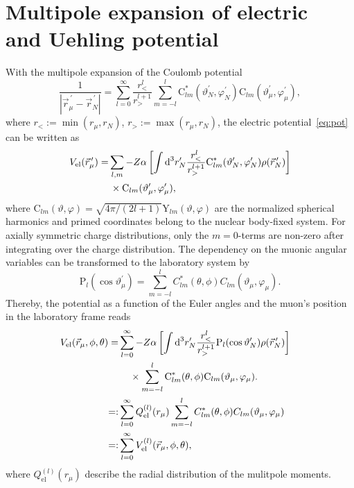 \section{Multipole expansion of electric \\and Uehling potential}
\label{sec:multipole}
With the multipole expansion of the Coulomb potential~\cite{jackson1999}
\begin{equation}
\frac{1}{|\vec{r}_\mu^{\,\prime}-\vec{r}_N^{\,\prime}|}=\sum_{l=0}^\infty \frac{r_<^l}{r_>^{l+1}}\sum_{m=-l}^l  \text{C}^*_{lm}(\vartheta_N^{\prime},\varphi_N^{\prime})\text{C}_{lm}(\vartheta_\mu^\prime,\varphi_\mu^\prime),
\end{equation}
where $r_<:=\min (r_\mu,r_N)$, $r_>:=\max (r_\mu,r_N)$, the electric potential~\eqref{eq:pot} can be written as
\begin{align}
V_{\text{el}}(\vec{r}_\mu^{\,\prime})=&\sum_{l,m}-Z\alpha \left[ \int \text{d}^3r^{\prime}_N \frac{r_<^l}{r_>^{l+1}}\text{C}^*_{lm}(\vartheta_N^{\prime},\varphi_N^{\prime})\rho(\vec{r}_N^{\,\prime})\right]\notag\\
&\,\times\text{C}_{lm}(\vartheta_\mu^{\prime},\varphi_\mu^\prime),
\end{align}
where ${\text{C}_{lm}(\vartheta,\varphi)}{=}{\sqrt{4\pi/(2l+1)}\text{Y}_{lm}(\vartheta,\varphi)}$ are the normalized spherical harmonics and primed coordinates belong to the nuclear body-fixed system.
For axially symmetric charge distributions, only the ${m}{=}{0}$-terms are non-zero after integrating over the charge distribution. The dependency on the muonic angular variables can be transformed to the laboratory system by
\begin{equation}
\text{P}_{l}(\cos\vartheta_\mu^\prime)=
 \sum_{m=-l}^l C^*_{lm}(\theta,\phi)C_{lm}(\vartheta_\mu,\varphi_\mu).
\end{equation}
Thereby, the potential as a function of the Euler angles and the muon's position in the laboratory frame reads
\begin{align}
V_{\text{el}}(\vec{r}_\mu,\phi,\theta)=&\sum_{l=0}^\infty-Z\alpha \left[ \int \text{d}^3r^{\prime}_N \frac{r_<^l}{r_>^{l+1}}\text{P}_{l}(\cos \vartheta_N^{\prime})\rho(\vec{r}_N^{\,\prime})\right]\notag\\
&\quad\,\times \sum_{m=-l}^l \text{C}^*_{lm}(\theta,\phi)\text{C}_{lm}(\vartheta_\mu,\varphi_\mu).\notag\\
=:&\sum_{l=0}^\infty Q_{\text{el}}^{(l)}(r_\mu)\sum_{m=-l}^lC^*_{lm}(\theta,\phi)C_{lm}(\vartheta_\mu,\varphi_\mu)&\notag\\
=:& \sum_{l=0}^\infty V^{(l)}_{\text{el}}(\vec{r}_\mu,\phi,\theta),
\label{eq:defmulti_2}
\end{align}
where $Q_{\text{el}}^{(l)}(r_\mu)$ describe the radial distribution of the mulitpole moments.

